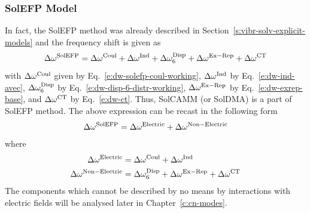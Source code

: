 \documentclass[a4paper,titlepage,twoside,fleqn,12pt]{book}
\begin{document}
\begin{refsection}
\subsubsection{SolEFP Model\label{s:solefp-working-model}}

In fact, the SolEFP method was already described in Section~\ref{s:vibr-solv-explicit-models}
and the frequency shift is given as
%
\begin{equation} \label{e:dw-solefp}
\Delta\omega^{\rm SolEFP} = 
\Delta\omega^{\rm Coul} + \Delta\omega^{\rm Ind} + \Delta\omega^{\rm Disp}_6 +
\Delta\omega^{\rm Ex-Rep} + \Delta\omega^{\rm CT}
\end{equation}
%
with $\Delta\omega^{\rm Coul}$ given by Eq.~\eqref{e:dw-solefp-coul-working},  
$\Delta\omega^{\rm Ind}$ by Eq.~\eqref{e:dw-ind-avec},
$\Delta\omega^{\rm Disp}_6$ by Eq.~\eqref{e:dw-disp-6-distr-working},
$\Delta\omega^{\rm Ex-Rep}$ by Eq.~\eqref{e:dw-exrep-base},
and $\Delta\omega^{\rm CT}$ by Eq.~\eqref{e:dw-ct}.
Thus, SolCAMM (or SolDMA) is a part of SolEFP method.
The above expression can be recast in the following form
%
\begin{equation} \label{e:dw-solefp-electric-nonelectric}
\Delta\omega^{\rm SolEFP} = 
\Delta\omega^{\rm Electric} + \Delta\omega^{\rm Non-Electric}
\end{equation}
%
where
%
\begin{subequations} 
\begin{align}
\Delta\omega^{\rm Electric}       &=  \Delta\omega^{\rm Coul} + \Delta\omega^{\rm Ind} \label{e:dw-solefp-electric} \\ 
 \Delta\omega^{\rm Non-Electric}  &=  \Delta\omega^{\rm Disp}_6 +
\Delta\omega^{\rm Ex-Rep} + \Delta\omega^{\rm CT} \label{e:dw-solefp-nonelectric}
\end{align}
\end{subequations}
%
The components which cannot be described by no means by interactions
with electric fields  will be analysed later in Chapter~\ref{c:cn-modes}.


\end{refsection}
\end{document}
